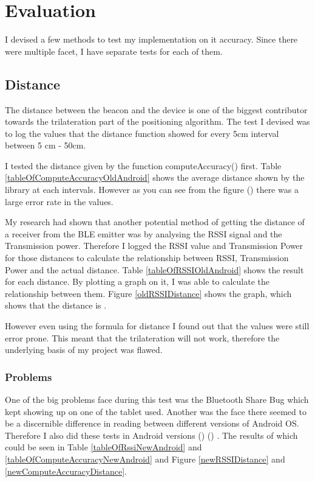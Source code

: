\section{Evaluation}
I devised a few methods to test my implementation on it accuracy. Since there were multiple facet, I have separate tests for each of them.
\subsection{Distance}
The distance between the beacon and the device is one of the biggest contributor towards the trilateration part of the positioning algorithm. The test I devised was to log the values that the distance function showed for every 5cm interval between 5 cm - 50cm.

I tested the distance given by the function computeAccuracy() first. Table \ref{tableOfComputeAccuracyOldAndroid} shows the average distance shown by the library at each intervals. However as you can see from the figure () there was a large error rate in the values. 

My research had shown that another potential method of getting the distance of a receiver from the BLE emitter was by analysing the RSSI signal and the Transmission power. Therefore I logged the RSSI value and Transmission Power for those distances to calculate the relationship between RSSI, Transmission Power and the actual distance. Table \ref{tableOfRSSIOldAndroid} shows the result for each distance. By plotting a graph on it, I was able to calculate the relationship between them. Figure \ref{oldRSSIDistance} shows the graph, which shows that the distance is .

However even using the formula for distance I found out that the values were still error prone. This meant that the trilateration will not work, therefore the underlying basis of my project was flawed.
\subsubsection{Problems}
One of the big problems face during this test was the Bluetooth Share Bug\cite{bluetooth-share} which kept showing up on one of the tablet used. Another was the face there seemed to be a discernible difference in reading between different versions of Android OS. Therefore I also did these tests in Android versions () () . The results of which could be seen in Table \ref{tableOfRssiNewAndroid} and \ref{tableOfComputeAccuracyNewAndroid} and Figure \ref{newRSSIDistance} and \ref{newComputeAccuracyDistance}.

